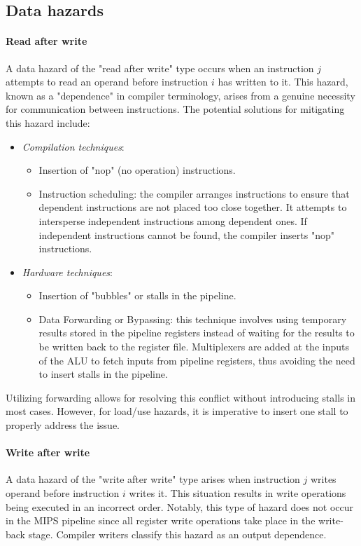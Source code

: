 \subsection{Data hazards}
\paragraph*{Read after write}
A data hazard of the "read after write" type occurs when an instruction $j$ attempts to read an operand before instruction $i$ has written to it. This hazard, known as a "dependence" in compiler terminology, arises from a genuine necessity for communication between instructions.
The potential solutions for mitigating this hazard include:
\begin{itemize}
    \item \textit{Compilation techniques}: 
        \begin{itemize}
            \item Insertion of "nop" (no operation) instructions.
            \item Instruction scheduling: the compiler arranges instructions to ensure that dependent instructions are not placed too close together. 
                It attempts to intersperse independent instructions among dependent ones. 
                If independent instructions cannot be found, the compiler inserts "nop" instructions.
        \end{itemize}
    \item \textit{Hardware techniques}:
        \begin{itemize}
            \item Insertion of "bubbles" or stalls in the pipeline.
            \item Data Forwarding or Bypassing: this technique involves using temporary results stored in the pipeline registers instead of waiting for the results to be written back to the register file. 
                Multiplexers are added at the inputs of the ALU to fetch inputs from pipeline registers, thus avoiding the need to insert stalls in the pipeline.
        \end{itemize}
\end{itemize}
Utilizing forwarding allows for resolving this conflict without introducing stalls in most cases. 
However, for load/use hazards, it is imperative to insert one stall to properly address the issue.

\paragraph*{Write after write}
A data hazard of the "write after write" type arises when instruction $j$ writes operand before instruction $i$ writes it. 
This situation results in write operations being executed in an incorrect order. 
Notably, this type of hazard does not occur in the MIPS pipeline since all register write operations take place in the write-back stage. 
Compiler writers classify this hazard as an output dependence.

